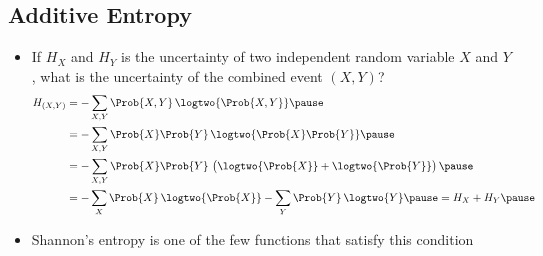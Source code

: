 
\begin{slide}
\section[-2]{Additive Entropy}

\begin{PauseHighLight}
  \begin{itemize}
  \item If $H_X$ and $H_Y$ is the uncertainty of two independent random
    variable $X$ and $Y$, what  is the uncertainty of the combined
    event $(X,Y)$?
    \begin{align*}
      H_{(X,Y)}
      &= -\sum_{X,Y} \Prob{X,Y} \, \logtwo{\Prob{X, Y}}\pause\\
      &= -\sum_{X,Y} \Prob{X}\Prob{Y} \, \logtwo{\Prob{X} \Prob{Y}}\pause\\
      &= -\sum_{X,Y} \Prob{X}\Prob{Y} \,\left(  \strut\logtwo{\Prob{X}}+
        \logtwo{\Prob{Y}} \right)\pause\\
      &= -\sum_X \Prob{X}\,\logtwo{\Prob{X}} - \sum_Y
        \Prob{Y}\,\logtwo{Y}\pause
        = H_X + H_Y\pause
    \end{align*}
  \item Shannon's entropy is one of the few functions that satisfy
    this condition\pause
  \end{itemize}
\end{PauseHighLight}

\end{slide}


\Outline %


